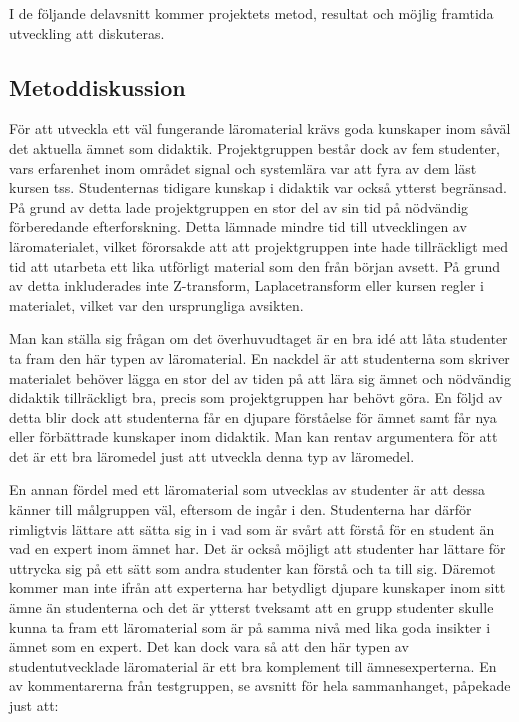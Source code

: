 \documentclass[12pt,a4paper,twoside,openright]{article}
\begin{document}
I de följande delavsnitt kommer projektets metod, resultat och möjlig
framtida utveckling att diskuteras.

\subsection{Metoddiskussion}
\label{sec:metDisk}
För att utveckla ett väl fungerande läromaterial krävs goda kunskaper
inom såväl det aktuella ämnet som didaktik. Projektgruppen består dock
av fem studenter, vars erfarenhet inom området signal och systemlära
var att fyra av dem läst kursen \gls{tss}. Studenternas tidigare
kunskap i didaktik var också ytterst begränsad. På grund av detta lade
projekt\-gruppen en stor del av sin tid på nödvändig förberedande
efterforskning. Detta lämnade mindre tid till utvecklingen av
läromaterialet, vilket förorsakde att att projektgruppen inte hade
tillräckligt med tid att utarbeta ett lika utförligt material som den från
början avsett. På grund av detta inkluderades inte Z-transform,
Laplacetransform eller kursen \gls{regler} i materialet, vilket var den
ursprungliga avsikten.

Man kan ställa sig frågan om det överhuvudtaget är en bra idé att låta
studenter ta fram den här typen av läromaterial. En nackdel är att
studenterna som skriver materialet behöver lägga en stor del av tiden
på att lära sig ämnet och nödvändig didaktik tillräckligt bra, precis
som projektgruppen har behövt göra.  En följd av detta blir dock att
studenterna får en djupare förståelse för ämnet samt får nya eller
förbättrade kunskaper inom didaktik.  Man kan rentav argumentera för
att det är ett bra läromedel just att utveckla denna typ av läromedel.

En annan fördel med ett läromaterial som utvecklas av studenter är att
dessa känner till målgruppen väl, eftersom de ingår
i den. Studenterna har därför rimligtvis lättare att sätta sig in i
vad som är svårt att förstå för en student än vad en expert inom ämnet
har. Det är också möjligt att studenter har lättare för uttrycka sig
på ett sätt som andra studenter kan förstå och ta till sig. Däremot
kommer man inte ifrån att experterna har betydligt djupare kunskaper
inom sitt ämne än studenterna och det är ytterst tveksamt att en grupp
studenter skulle kunna ta fram ett läromaterial som är på samma nivå
med lika goda insikter i ämnet som en expert. Det kan dock vara så att
den här typen av studentutvecklade läromaterial är ett bra komplement
till ämnesexperterna. En av kommentarerna från testgruppen, se avsnitt
 för hela sammanhanget, påpekade just att:
\end{document}
